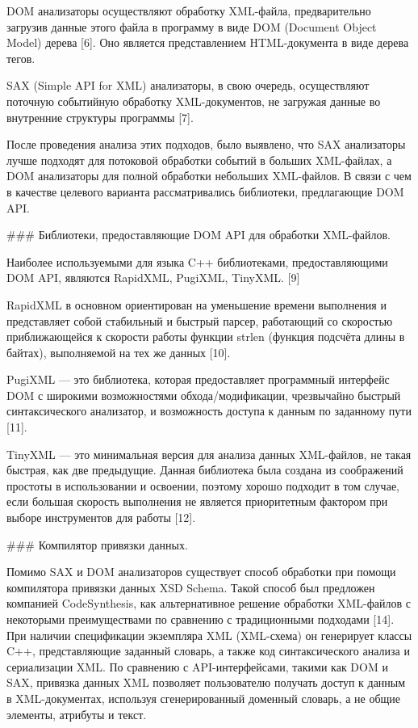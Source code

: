 DOM анализаторы осуществляют обработку XML-файла, предварительно загрузив данные этого файла в программу в виде DOM (Document Object Model) дерева [6]. Оно является представлением HTML-документа в виде дерева тегов.

SAX (Simple API for XML) анализаторы, в свою очередь, осуществляют поточную событийную обработку XML-документов, не загружая данные во внутренние структуры программы [7]. 

После проведения анализа этих подходов, было выявлено, что SAX анализаторы лучше подходят для потоковой обработки событий в больших XML-файлах, а DOM анализаторы для полной обработки небольших XML-файлов. В связи с чем в качестве целевого варианта рассматривались библиотеки, предлагающие DOM API.

### Библиотеки, предоставляющие DOM API для обработки XML-файлов.

Наиболее используемыми для языка C++ библиотеками, предоставляющими DOM API, являются RapidXML, PugiXML, TinyXML. [9]

RapidXML в основном ориентирован на уменьшение времени выполнения и представляет собой стабильный и быстрый парсер, работающий со скоростью приближающейся к скорости работы функции strlen (функция подсчёта длины в байтах), выполняемой на тех же данных [10].

PugiXML — это библиотека, которая предоставляет программный интерфейс DOM с широкими возможностями обхода/модификации, чрезвычайно быстрый синтаксического анализатор, и возможность доступа к данным по заданному пути [11]. 

TinyXML — это минимальная версия для анализа данных XML-файлов, не такая быстрая, как две предыдущие. Данная библиотека была создана из соображений простоты в использовании и освоении, поэтому хорошо подходит в том случае, если большая скорость выполнения не является приоритетным фактором при выборе инструментов для работы [12].

### Компилятор привязки данных.

Помимо SAX и DOM анализаторов существует способ обработки при помощи компилятора привязки данных XSD Schema. Такой способ был предложен компанией CodeSynthesis, как альтернативное решение обработки XML-файлов с некоторыми преимуществами по сравнению с традиционными подходами [14]. При наличии спецификации экземпляра XML (XML-схема) он генерирует классы C++, представляющие заданный словарь, а также код синтаксического анализа и сериализации XML. По сравнению с API-интерфейсами, такими как DOM и SAX, привязка данных XML позволяет пользователю получать доступ к данным в XML-документах, используя сгенерированный доменный словарь, а не общие элементы, атрибуты и текст.

